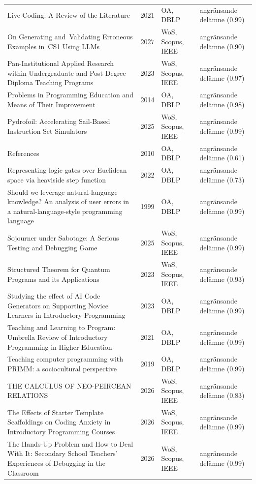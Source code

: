 \begin{longtable}{@{}%
  >{\raggedright\arraybackslash}p{}c%
  >{\raggedright\arraybackslash}p{}%
  >{\raggedright\arraybackslash}p{}@{}}
Live Coding: A Review of the Literature & 2021 & OA, DBLP & angränsande delämne (0.99) \\
On Generating and Validating Erroneous Examples in CS1 Using LLMs & 2027 & WoS, Scopus, IEEE & angränsande delämne (0.90) \\
Pan-Institutional Applied Research within Undergraduate and Post-Degree Diploma Teaching Programs & 2023 & WoS, Scopus, IEEE & angränsande delämne (0.97) \\
Problems in Programming Education and Means of Their Improvement & 2014 & OA, DBLP & angränsande delämne (0.98) \\
Pydrofoil: Accelerating Sail-Based Instruction Set Simulators & 2025 & WoS, Scopus, IEEE & angränsande delämne (0.99) \\
References & 2010 & OA, DBLP & angränsande delämne (0.61) \\
Representing logic gates over Euclidean space via heaviside step function & 2022 & OA, DBLP & angränsande delämne (0.73) \\
Should we leverage natural-language knowledge? An analysis of user errors in a natural-language-style programming language & 1999 & OA, DBLP & angränsande delämne (0.99) \\
Sojourner under Sabotage: A Serious Testing and Debugging Game & 2025 & WoS, Scopus, IEEE & angränsande delämne (0.99) \\
Structured Theorem for Quantum Programs and its Applications & 2023 & WoS, Scopus, IEEE & angränsande delämne (0.93) \\
Studying the effect of AI Code Generators on Supporting Novice Learners in Introductory Programming & 2023 & OA, DBLP & angränsande delämne (0.99) \\
Teaching and Learning to Program: Umbrella Review of Introductory Programming in Higher Education & 2021 & OA, DBLP & angränsande delämne (0.99) \\
Teaching computer programming with PRIMM: a sociocultural perspective & 2019 & OA, DBLP & angränsande delämne (0.99) \\
THE CALCULUS OF NEO-PEIRCEAN RELATIONS & 2026 & WoS, Scopus, IEEE & angränsande delämne (0.83) \\
The Effects of Starter Template Scaffoldings on Coding Anxiety in Introductory Programming Courses & 2026 & WoS, Scopus, IEEE & angränsande delämne (0.99) \\
The Hands-Up Problem and How to Deal With It: Secondary School Teachers' Experiences of Debugging in the Classroom & 2026 & WoS, Scopus, IEEE & angränsande delämne (0.99) \\

\end{longtable}
